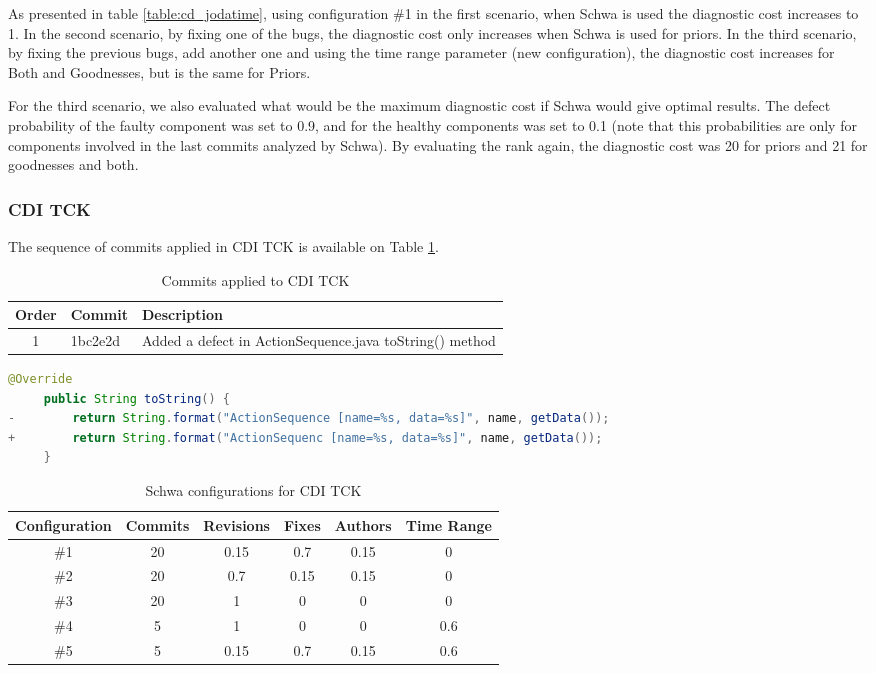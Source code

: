 As presented in table \ref{table:cd_jodatime}, using configuration \#1 in the first scenario, when Schwa is used the diagnostic cost increases to 1. In the second scenario, by fixing one of the bugs, the diagnostic cost only increases when Schwa is used for priors. In the third scenario, by fixing the previous bugs, add another one and using the time range parameter (new configuration), the diagnostic cost increases for Both and Goodnesses, but is the same for Priors.

For the third scenario, we also evaluated what would be the maximum diagnostic cost if Schwa would give optimal results. The defect probability of the faulty component was set to 0.9, and for the healthy components was set to 0.1 (note that this probabilities are only for components involved in the last commits analyzed by Schwa). By evaluating the rank again, the diagnostic cost was 20 for priors and 21 for goodnesses and both.

\subsubsection{CDI TCK}
The sequence of commits applied in CDI TCK is available on Table \ref{table:commits_cditck}.
\begin{table}[H]
    \centering
    \caption{Commits applied to CDI TCK}
    \label{table:commits_cditck}
    \begin{tabular}{|c|l|l|}
        \hline
        Order & Commit & Description \\ \hline
        1 & 1bc2e2d	& Added a defect in ActionSequence.java toString() method \\ \hline
        
    \end{tabular}
\end{table}

\begin{lstlisting}[language=java, caption=Commit 1bc2e2d patch]
   @Override
     public String toString() {
-        return String.format("ActionSequence [name=%s, data=%s]", name, getData());
+        return String.format("ActionSequenc [name=%s, data=%s]", name, getData());
     }
\end{lstlisting}

\begin{table}[H]
    \centering
    \caption{Schwa configurations for CDI TCK}
    \label{table:configs_cdi_tck}
    \begin{tabular}{|c|c|c|c|c|c|}
        \hline
        Configuration & Commits & Revisions & Fixes & Authors & Time Range \\ \hline
        \#1 & 20 & 0.15 & 0.7 & 0.15 & 0\\ \hline
        \#2 & 20 & 0.7 & 0.15 & 0.15 & 0\\ \hline
        \#3 & 20 & 1 & 0 & 0 & 0\\ \hline
        \#4 & 5 & 1 & 0 & 0 & 0.6\\ \hline
        \#5 & 5 & 0.15 & 0.7 & 0.15 & 0.6\\ \hline
    \end{tabular}
\end{table}

